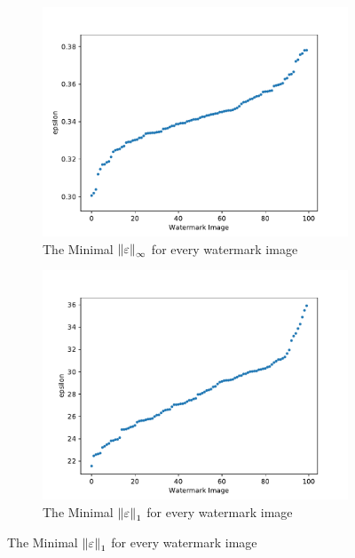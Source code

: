 \documentclass{easychair}
\begin{document}
\begin{figure}[htp]
  \centering
  \begin{subfigure}{0.4\linewidth}
    \includegraphics[width=\linewidth]{../data/results/problem3/mnist_w_wm_sorted.pdf}
     \caption{The Minimal $\left\lVert\varepsilon\right\rVert_{\infty}$ for every watermark image}
  	\label{fig:minSingleLP}
  \end{subfigure}
  \begin{subfigure}{0.4\linewidth}
    \includegraphics[width=\linewidth]{../data/results/problem2/mnist_w_wm_sorted.pdf}
    \caption{The Minimal $\left\lVert\varepsilon\right\rVert_1$ for every watermark image}
  	\label{fig:minSingleNotLP}
  \end{subfigure}
\label{fig:minSingle}
\end{figure}
\end{document}
